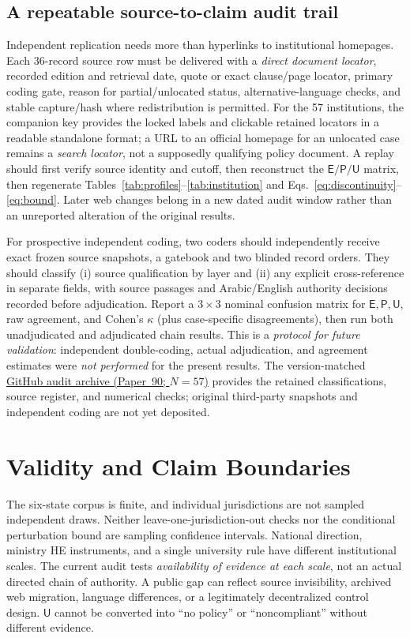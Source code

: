 \documentclass[conference,letterpaper]{IEEEtran}
\newcommand{\stE}{\textsf{E}}
\newcommand{\stP}{\textsf{P}}
\newcommand{\stU}{\textsf{U}}
\begin{document}
\subsection{A repeatable source-to-claim audit trail}
Independent replication needs more than hyperlinks to institutional homepages. Each 36-record source row must be delivered with a \emph{direct document locator}, recorded edition and retrieval date, quote or exact clause/page locator, primary coding gate, reason for partial/unlocated status, alternative-language checks, and stable capture/hash where redistribution is permitted. For the 57 institutions, the companion key provides the locked labels and clickable retained locators in a readable standalone format; a URL to an official homepage for an unlocated case remains a \emph{search locator}, not a supposedly qualifying policy document. A replay should first verify source identity and cutoff, then reconstruct the $\stE/\stP/\stU$ matrix, then regenerate Tables~\ref{tab:profiles}--\ref{tab:institution} and Eqs.~\eqref{eq:discontinuity}--\eqref{eq:bound}. Later web changes belong in a new dated audit window rather than an unreported alteration of the original results.

For prospective independent coding, two coders should independently receive exact frozen source snapshots, a gatebook and two blinded record orders. They should classify (i) source qualification by layer and (ii) any explicit cross-reference in separate fields, with source passages and Arabic/English authority decisions recorded before adjudication. Report a $3\!\times\!3$ nominal confusion matrix for $\stE,\stP,\stU$, raw agreement, and Cohen's $\kappa$ (plus case-specific disagreements), then run both unadjudicated and adjudicated chain results. This is a \emph{protocol for future validation}: independent double-coding, actual adjudication, and agreement estimates were \emph{not performed} for the present results. The version-matched \href{https://github.com/shaikhamalkawi-ux/From-AI-Strategy-to-University-Rules-in-the-GCC/tree/main/ICAMAC2026_Paper90_R2_57}{GitHub audit archive (Paper~90; $N=57$)} provides the retained classifications, source register, and numerical checks; original third-party snapshots and independent coding are not yet deposited.


\section{Validity and Claim Boundaries}
The six-state corpus is finite, and individual jurisdictions are not sampled independent draws. Neither leave-one-jurisdiction-out checks nor the conditional perturbation bound are sampling confidence intervals. National direction, ministry HE instruments, and a single university rule have different institutional scales. The current audit tests \emph{availability of evidence at each scale}, not an actual directed chain of authority. A public gap can reflect source invisibility, archived web migration, language differences, or a legitimately decentralized control design. $\stU$ cannot be converted into ``no policy'' or ``noncompliant'' without different evidence.
\end{document}
